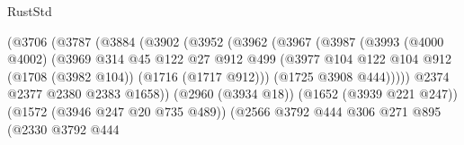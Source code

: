 \begin{lexlean}{RustStd}
\begin{coremodule}
{\begin{coremodule}
{{{{{{{{{{{                                        (@3706
                                          (@3787
                                            (@3884
                                              (@3902
                                                (@3952
                                                  (@3962
                                                    (@3967
                                                      (@3987
                                                        (@3993
                                                          (@4000 @4002)
                                                          (@3969
                                                            @314
                                                            @45
                                                            @122
                                                            @27
                                                            @912
                                                            @499
                                                            (@3977
                                                              @104
                                                              @122
                                                              @104
                                                              @912
                                                              (@1708 (@3982 @104))
                                                              (@1716 (@1717 @912)))
                                                            (@1725 @3908 @444)))))
                                                    @2374
                                                    @2377
                                                    @2380
                                                    @2383
                                                    @1658))
                                                (@2960 (@3934 @18))
                                                (@1652 (@3939 @221 @247))
                                                (@1572 (@3946 @247 @20 @735 @489))
                                                (@2566
                                                  @3792
                                                  @444
                                                  @306
                                                  @271
                                                  @895
                                                  (@2330
                                                    @3792
                                                    @444
}}}}}}}}}}}
\end{coremodule}}
\end{coremodule}
\end{lexlean}
